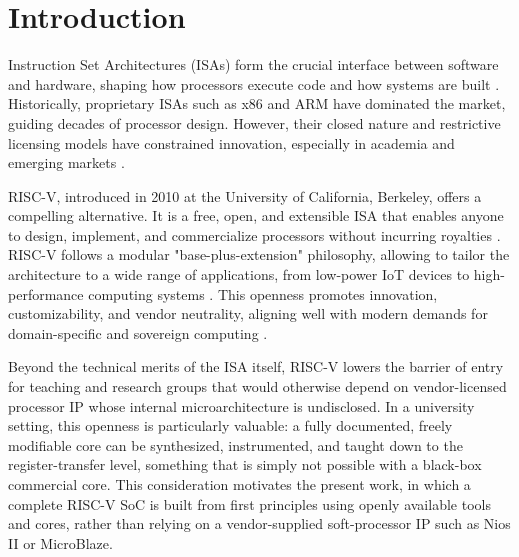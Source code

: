 \documentclass[runningheads]{llncs}
\begin{document}
\section{Introduction}\label{sec1}

Instruction Set Architectures (ISAs) form the crucial interface between software and hardware, shaping how processors execute code and how systems are built \cite{Patterson2016}. Historically, proprietary ISAs such as x86 and ARM have dominated the market, guiding decades of processor design. However, their closed nature and restrictive licensing models have constrained innovation, especially in academia and emerging markets \cite{Waterman2014}.

RISC-V, introduced in 2010 at the University of California, Berkeley, offers a compelling alternative. It is a free, open, and extensible ISA that enables anyone to design, implement, and commercialize processors without incurring royalties \cite{Asanovic2011}. RISC-V follows a modular "base-plus-extension" philosophy, allowing to tailor the architecture to a wide range of applications, from low-power IoT devices to high-performance computing systems \cite{Waterman2014}. This openness promotes innovation, customizability, and vendor neutrality, aligning well with modern demands for domain-specific and sovereign computing \cite{10049118}.

Beyond the technical merits of the ISA itself, RISC-V lowers the barrier of entry for teaching and research groups that would otherwise depend on vendor-licensed processor IP whose internal microarchitecture is undisclosed. In a university setting, this openness is particularly valuable: a fully documented, freely modifiable core can be synthesized, instrumented, and taught down to the register-transfer level, something that is simply not possible with a black-box commercial core. This consideration motivates the present work, in which a complete RISC-V SoC is built from first principles using openly available tools and cores, rather than relying on a vendor-supplied soft-processor IP such as Nios II or MicroBlaze.
\end{document}
